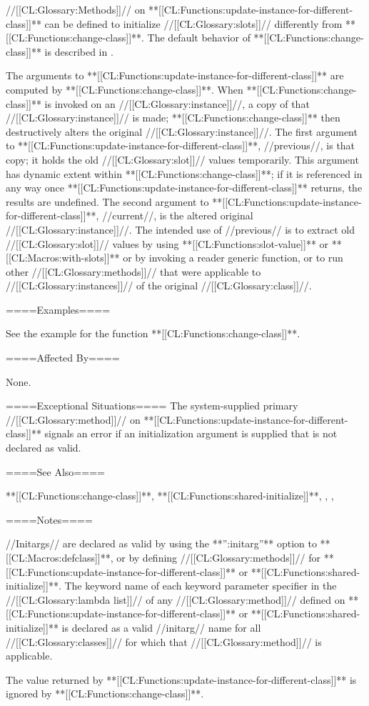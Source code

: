 //[[CL:Glossary:Methods]]// on **[[CL:Functions:update-instance-for-different-class]]** can be defined to initialize //[[CL:Glossary:slots]]// differently from **[[CL:Functions:change-class]]**. The default behavior of **[[CL:Functions:change-class]]** is described in \secref\ChangingInstanceClass.

The arguments to **[[CL:Functions:update-instance-for-different-class]]** are computed by **[[CL:Functions:change-class]]**. When **[[CL:Functions:change-class]]** is invoked on an //[[CL:Glossary:instance]]//, a copy of that //[[CL:Glossary:instance]]// is made; **[[CL:Functions:change-class]]** then destructively alters the original //[[CL:Glossary:instance]]//. The first argument to **[[CL:Functions:update-instance-for-different-class]]**, //previous//, is that copy; it holds the old //[[CL:Glossary:slot]]// values temporarily. This argument has dynamic extent within **[[CL:Functions:change-class]]**; if it is referenced in any way once **[[CL:Functions:update-instance-for-different-class]]** returns, the results are undefined. The second argument to **[[CL:Functions:update-instance-for-different-class]]**, //current//, is the altered original //[[CL:Glossary:instance]]//. The intended use of //previous// is to extract old //[[CL:Glossary:slot]]// values by using **[[CL:Functions:slot-value]]** or **[[CL:Macros:with-slots]]** or by invoking a reader generic function, or to run other //[[CL:Glossary:methods]]// that were applicable to //[[CL:Glossary:instances]]// of the original //[[CL:Glossary:class]]//.



====Examples====

See the example for the function **[[CL:Functions:change-class]]**.

====Affected By====

None.

====Exceptional Situations==== The system-supplied primary //[[CL:Glossary:method]]// on **[[CL:Functions:update-instance-for-different-class]]** signals an error if an initialization argument is supplied that is not declared as valid.

====See Also====

**[[CL:Functions:change-class]]**, **[[CL:Functions:shared-initialize]]**, {\secref\ChangingInstanceClass}, {\secref\InitargRules}, {\secref\DeclaringInitargValidity}

====Notes====

//Initargs// are declared as valid by using the **'':initarg''** option to **[[CL:Macros:defclass]]**, or by defining //[[CL:Glossary:methods]]// for **[[CL:Functions:update-instance-for-different-class]]** or **[[CL:Functions:shared-initialize]]**. The keyword name of each keyword parameter specifier in the //[[CL:Glossary:lambda list]]// of any //[[CL:Glossary:method]]// defined on **[[CL:Functions:update-instance-for-different-class]]** or **[[CL:Functions:shared-initialize]]** is declared as a valid //initarg// name for all //[[CL:Glossary:classes]]// for which that //[[CL:Glossary:method]]// is applicable.

The value returned by **[[CL:Functions:update-instance-for-different-class]]** is ignored by **[[CL:Functions:change-class]]**.



